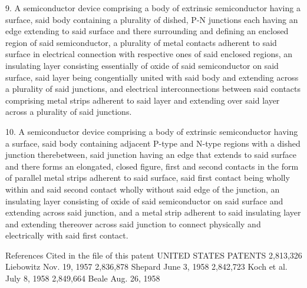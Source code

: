 9. A semiconductor device comprising a body of extrinsic semiconductor having a surface, said body containing a plurality of dished, P-N junctions each having an edge extending to said surface and there surrounding and defining an enclosed region of said semiconductor, a plurality of metal contacts adherent to said surface in electrical connection with respective ones of said enclosed regions, an insulating layer consisting essentially of oxide of said semiconductor on said surface, said layer being congentially united with said body and extending across a plurality of said junctions, and electrical interconnections between said contacts comprising metal strips adherent to said layer and extending over said layer across a plurality of said junctions.

10. A semiconductor device comprising a body of extrinsic semiconductor having a surface, said body containing adjacent P-type and N-type regions with a dished junction therebetween, said junction having an edge that extends to said surface and there forms an elongated, closed figure, first and second contacts in the form of parallel metal strips adherent to said surface, said first contact being wholly within and said second contact wholly without said edge of the junction, an insulating layer consisting of oxide of said semiconductor on said surface and extending across said junction, and a metal strip adherent to said insulating layer and extending thereover across said junction to connect physically and electrically with said first contact.

References Cited in the file of this patent UNITED STATES PATENTS 2,813,326 Liebowitz Nov. 19, 1957 2,836,878 Shepard June 3, 1958 2,842,723 Koch et al. July 8, 1958 2,849,664 Beale Aug. 26, 1958
